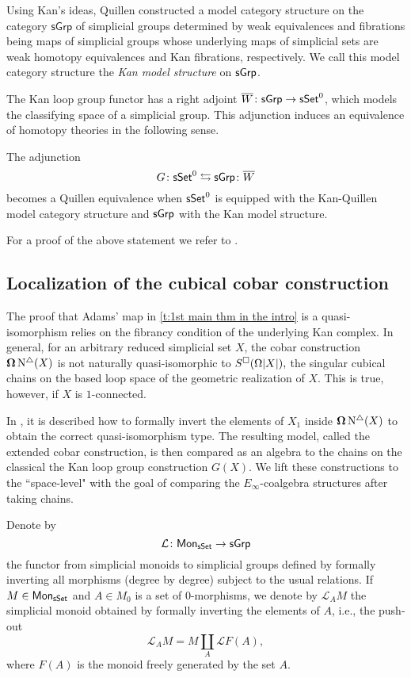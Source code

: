 Using Kan's ideas, Quillen constructed a model category structure on the category $\mathsf{sGrp}$ of simplicial groups determined by
weak equivalences and fibrations being maps of simplicial groups whose underlying maps of simplicial sets are weak homotopy equivalences and Kan fibrations, respectively. 
We call this model category structure the \textit{Kan model structure} on $\mathsf{sGrp}$.

The Kan loop group functor has a right adjoint $\overline{W} \colon \mathsf{sGrp} \to \mathsf{sSet}^0$, which models the classifying space of a simplicial group.
This adjunction induces an equivalence of homotopy theories in the following sense.

\begin{proposition} \label{kan}
    The adjunction
	$$G \colon \mathsf{sSet}^0 \leftrightarrows \mathsf{sGrp}\colon \overline{W}$$
	becomes a Quillen equivalence when $\mathsf{sSet}^0$ is equipped with the Kan-Quillen model category structure and $\mathsf{sGrp}$ with the Kan model structure.
\end{proposition}

For a proof of the above statement we refer to \cite[Chapter V]{goerss2009simplicial}.

\subsection{Localization of the cubical cobar construction}

The proof that Adams' map in \cref{t:1st main thm in the intro} is a quasi-isomorphism relies on the fibrancy condition of the underlying Kan complex.
In general, for an arbitrary reduced simplicial set $X$, the cobar construction $\operatorname{\mathbf{\Omega}} \operatorname{N^{\triangle}}(X)$ is not naturally quasi-isomorphic to $S^{\square}(\Omega|X|),$ the singular cubical chains on the based loop space of the geometric realization of $X$.
This is true, however, if $X$ is $1$-connected.

In \cite{hess2010cobar}, it is described how to formally invert the elements of $X_1$ inside $\operatorname{\mathbf{\Omega}} \operatorname{N^{\triangle}}(X)$ to obtain the correct quasi-isomorphism type.
The resulting model, called the extended cobar construction, is then compared as an algebra to the chains on the classical the Kan loop group construction $G(X)$.
We lift these constructions to the ``space-level" with the goal of comparing the $E_{\infty}$-coalgebra structures after taking chains.

Denote by
$$\mathcal{L} \colon \mathsf{Mon}_{\mathsf{sSet}} \to \mathsf{sGrp}$$
the functor from simplicial monoids to simplicial groups defined by formally inverting all morphisms (degree by degree) subject to the usual relations.
If $M \in \mathsf{Mon}_{\mathsf{sSet}}$ and $A \in M_0$ is a set of $0$-morphisms, we denote by $\mathcal{L}_AM$ the simplicial monoid obtained by formally inverting the elements of $A$, i.e., the push-out
$$\mathcal{L}_AM = M \coprod_{A} \mathcal{L}F(A),$$
where $F(A)$ is the monoid freely generated by the set $A$.

